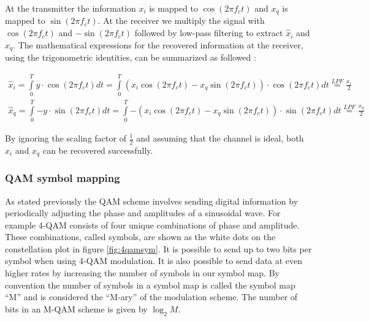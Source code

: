 \documentclass[12pt,a4paper,openright]{report}
\begin{document}
At the transmitter the information $x_i$ is mapped to $\cos (2\pi {f_c}t)$ and $x_q$ is mapped to $\sin (2\pi {f_c}t)$. At the receiver we multiply the signal with $\cos (2\pi {f_c}t)$ and $-$$\sin (2\pi {f_c}t)$ followed by low-pass filtering to extract $\hat{x}_i$ and $\hat{x}_q$. The mathematical expressions for the recovered information at the receiver, using the trigonometric identities, can be summarized as followed \cite{Madhow}: 

\begin{eqnarray}
{{\hat x}_i} = \int\limits_0^T {y \cdot \cos (2\pi {f_c}t)dt = } \int\limits_0^T {\left( {{x_i}\cos (2\pi {f_c}t) - {x_q}\sin (2\pi {f_c}t)} \right) \cdot \cos (2\pi {f_c}t)dt\mathop  = \limits^{LPF} \frac{{{x_i}}}{2}}\\
{{\hat x}_q} = \int\limits_0^T { - y\cdot \sin (2\pi {f_c}t)dt = } \int\limits_0^T { - \left( {{x_i}\cos (2\pi {f_c}t) - {x_q}\sin (2\pi {f_c}t)} \right) \cdot \sin (2\pi {f_c}t)dt\mathop  = \limits^{LPF} \frac{{{x_q}}}{2}} 
\end{eqnarray}

By ignoring the scaling factor of $\frac{1}{2}$ and assuming that the channel is ideal, both $x_i$ and $x_q$ can be recovered successfully. 

\subsubsection{QAM symbol mapping}

As stated previously the QAM scheme involves sending digital information by periodically adjusting the phase and amplitudes of a sinusoidal wave. For example 4-QAM consists of four unique combinations of phase and amplitude. These combinations, called symbols, are shown as the white dots on the constellation plot in figure \ref{fig:4qamsym}. It is possible to send up to two bits per symbol when using 4-QAM modulation. It is also possible to send data at even higher rates by increasing the number of symbols in our symbol map. By convention the number of symbols in a symbol map is called the symbol map “M” and is considered the “M-ary” of the modulation scheme. The number of bits in an M-QAM scheme is given by ${{{\log }_2}M}$. 
\end{document}
